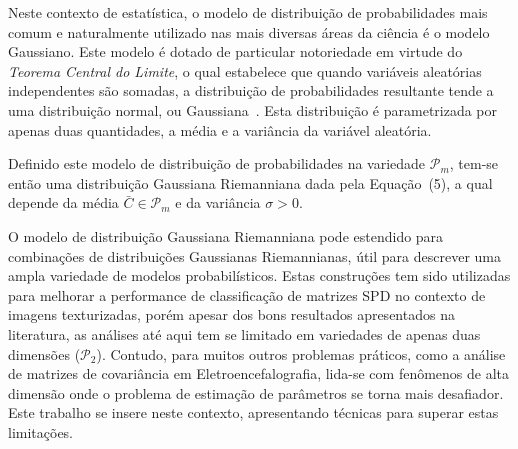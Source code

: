 \documentclass[a4paper,titlepage]{article}
\begin{document}
Neste contexto de estatística, o modelo de distribuição de probabilidades
mais comum e naturalmente utilizado nas mais diversas áreas da ciência é o
modelo Gaussiano. Este modelo é dotado de particular notoriedade em virtude do
\textit{Teorema Central do Limite}, o qual estabelece que quando variáveis
aleatórias independentes são somadas, a distribuição de probabilidades
resultante tende a uma distribuição normal, ou
Gaussiana~\cite{fischer2010history}. Esta distribuição é parametrizada por
apenas duas quantidades, a média e a variância da variável aleatória.

Definido este modelo de distribuição de probabilidades na variedade
$\mathcal{P}_m$, tem-se então uma distribuição Gaussiana Riemanniana dada pela
Equação~(5), a qual depende da média $\bar{C} \in \mathcal{P}_m$ e da variância
$\sigma > 0$.

\begin{center}
  \vspace{1em}
  \vspace{1em}
\end{center}

O modelo de distribuição Gaussiana Riemanniana pode estendido para combinações
de distribuições Gaussianas Riemannianas, útil para descrever uma ampla
variedade de modelos probabilísticos. Estas construções tem sido utilizadas
para melhorar a performance de classificação de matrizes SPD no contexto de
imagens texturizadas, porém apesar dos bons resultados apresentados na
literatura, as análises até aqui tem se limitado em variedades de apenas duas
dimensões ($\mathcal{P}_2$). Contudo, para muitos outros problemas práticos,
como a análise de matrizes de covariância em Eletroencefalografia, lida-se com
fenômenos de alta dimensão onde o problema de estimação de parâmetros se torna
mais desafiador. Este trabalho se insere neste contexto, apresentando técnicas
para superar estas limitações.
\end{document}
